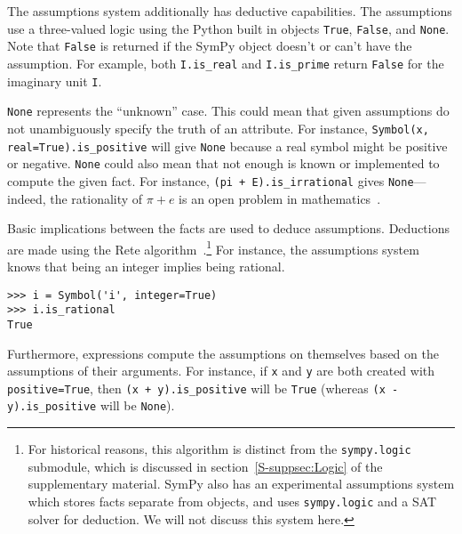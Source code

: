 The assumptions system additionally has deductive capabilities. The
assumptions use a three-valued logic using the Python built in objects
\texttt{True}, \texttt{False}, and \texttt{None}. Note that \texttt{False}
is returned if the SymPy object doesn't or can't have the assumption.
For example, both \texttt{I.is\_real} and \texttt{I.is\_prime} return
\texttt{False} for the imaginary unit \texttt{I}.

\texttt{None} represents the ``unknown'' case. This could mean that given
assumptions do not unambiguously specify the truth of an attribute. For
instance, \texttt{Symbol(\textquotesingle{}x\textquotesingle{},
  real=True).is\_positive} will give \texttt{None} because a real symbol might
be positive or negative. \texttt{None} could also mean that not enough is
known or implemented to compute the given fact. For instance, \texttt{(pi +
  E).is\_irrational} gives \texttt{None}---indeed, the rationality of
$\pi + e$ is an open problem in mathematics~\cite{lang1966introduction}.

Basic implications between the facts are used to deduce assumptions.
Deductions are made using the Rete
algorithm~\cite{doorenbos1995production}.\footnote{\label{note:assumptions}For
  historical reasons, this algorithm is distinct from the \texttt{sympy.logic}
  submodule, which is discussed in section~\ref{S-suppsec:Logic} of the
  supplementary material. SymPy also has an experimental assumptions system
  which stores facts separate from objects, and uses \texttt{sympy.logic} and
  a SAT solver for deduction. We will not discuss this system here.} For
instance, the assumptions system knows that being an integer implies being
rational.
\begin{verbatim}
>>> i = Symbol('i', integer=True)
>>> i.is_rational
True
\end{verbatim}
Furthermore, expressions compute the assumptions on themselves
based on the assumptions of their arguments. For instance, if \texttt{x} and
\texttt{y} are both created with \texttt{positive=True}, then
\texttt{(x + y).is\_positive} will be \texttt{True} (whereas
\texttt{(x - y).is\_positive} will be \texttt{None}).
